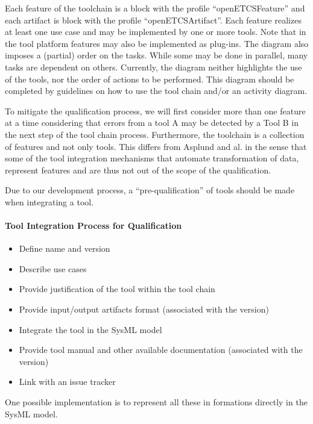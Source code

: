 Each feature of the toolchain is a block with the profile ``openETCSFeature''
and  each artifact is block with the profile ``openETCSArtifact''.  Each
feature realizes at least one use case and may be implemented by one or more tools.
Note that in the tool platform features  may also be
implemented as plug-ins. The diagram also imposes a (partial) order
on the tasks. While some may be done in parallel, many tasks are dependent on others.
Currently, the diagram neither highlights the use of the tools, nor the order of actions
to be performed. This diagram should be completed by guidelines on
how to use the tool chain and/or an activity diagram.

To mitigate the qualification process, we will first consider more
than one feature at a time considering that errors from a tool A may
be detected by a Tool B in the next step of the tool chain process.
Furthermore, the toolchain is a collection
of features and not only tools. This differs from Asplund and al. in the sense that
some of the tool integration mechanisms that automate transformation of data, represent features
 and are thus not out of the scope of the qualification.

Due to our development process, a ``pre-qualification'' of tools should be made
when integrating a tool.

\paragraph{Tool Integration Process for Qualification}

\begin{itemize}
\item Define name and version
\item Describe use cases
\item Provide justification of the tool within the tool chain
\item Provide input/output artifacts format (associated with the
  version)
\item Integrate the tool in the SysML model
\item Provide tool manual and other available documentation (associated with the version)
\item Link with an issue tracker
\end{itemize}

One possible implementation is to represent all these in formations
directly in the SysML model.


